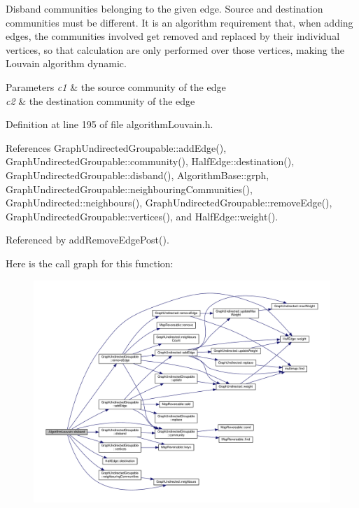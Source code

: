 Disband communities belonging to the given edge. Source and destination communities must be different. It is an algorithm requirement that, when adding edges, the communities involved get removed and replaced by their individual vertices, so that calculation are only performed over those vertices, making the Louvain algorithm dynamic. 
\begin{DoxyParams}{Parameters}
{\em c1} & the source community of the edge \\
\hline
{\em c2} & the destination community of the edge \\
\hline
\end{DoxyParams}


Definition at line 195 of file algorithm\+Louvain.\+h.



References Graph\+Undirected\+Groupable\+::add\+Edge(), Graph\+Undirected\+Groupable\+::community(), Half\+Edge\+::destination(), Graph\+Undirected\+Groupable\+::disband(), Algorithm\+Base\+::grph, Graph\+Undirected\+Groupable\+::neighbouring\+Communities(), Graph\+Undirected\+::neighbours(), Graph\+Undirected\+Groupable\+::remove\+Edge(), Graph\+Undirected\+Groupable\+::vertices(), and Half\+Edge\+::weight().



Referenced by add\+Remove\+Edge\+Post().

Here is the call graph for this function\+:
\nopagebreak
\begin{figure}[H]
\begin{center}
\leavevmode
\includegraphics[width=350pt]{classAlgorithmLouvain_a1e38f3c6a2df8b028328131b3dfceb94_cgraph}
\end{center}
\end{figure}
\mbox{\label{classAlgorithmLouvain_aa4b25143d94b4fabc830ea053b76dd7d}} 
